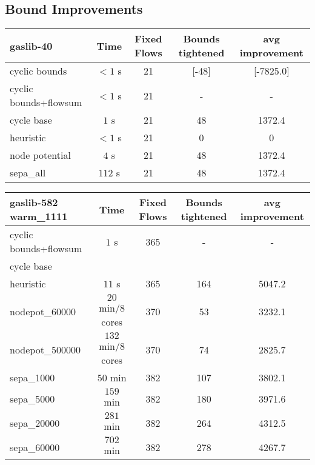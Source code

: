 \subsection{Bound Improvements}
\begin{center}

\begin{tabular}{ l | c | c | c | c }
\textbf{gaslib-40} & Time  & Fixed Flows & Bounds tightened & avg improvement\\
\hline
 cyclic bounds& $<1$ s& 21 & [-48] & [-7825.0] \\
 cyclic bounds+flowsum& $<1$ s& 21 & - & - \\
 cycle base& $1$ s & 21 & 48 & 1372.4\\
 heuristic& $<1$ s& 21& 0 & 0\\
 node potential& $4$ s& 21 & 48 & 1372.4 \\ 
 sepa\_all& $112$ s& 21 & 48 & 1372.4\\
\end{tabular} 
\end{center}

\begin{center}
\begin{tabular}{ l | c | c | c | c }
\textbf{gaslib-582 warm\_1111} & Time  & Fixed Flows & Bounds tightened & avg improvement \\
\hline
 cyclic bounds+flowsum& $1$ s& 365 & - & -\\
 cycle base& $ $ &  &  &\\
 heuristic& $ 11$ s& 365& 164 & 5047.2 \\
 nodepot\_60000& $20$ min/8 cores &370  &53  &3232.1   \\ 
 nodepot\_500000& $132$ min/8 cores & 370 & 74 & 2825.7  \\ 
 sepa\_1000& $ 50$ min & 382 & 107 & 3802.1 \\
 sepa\_5000& $ 159$ min & 382 & 180 & 3971.6 \\
 sepa\_20000& $ 281$ min & 382 & 264 & 4312.5 \\
 sepa\_60000& $702$ min  & 382& 278& 4267.7\\
\end{tabular} 
\end{center}

